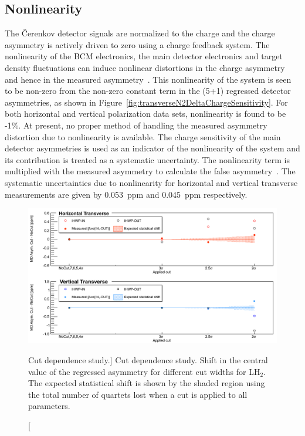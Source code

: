 \subsection{Nonlinearity}
\label{Nonlinearity}
The \v{C}erenkov detector signals are normalized to the charge and the charge asymmetry is actively driven to zero using a charge feedback system. The nonlinearity of the BCM electronics, the main detector electronics and target density fluctuations can induce nonlinear distortions in the charge asymmetry and hence in the measured asymmetry~\cite{mack_BCMLinearity}. This nonlinearity of the system is seen to be non-zero from the non-zero constant term in the (5+1) regressed detector asymmetries, as shown in Figure~\ref{fig:transverseN2DeltaChargeSensitivity}. For both horizontal and vertical polarization data sets, nonlinearity is found to be -1\%. At present, no proper method of handling the measured asymmetry distortion due to nonlinearity is available. The charge sensitivity of the main detector asymmetries is used as an indicator of the nonlinearity of the system and its contribution is treated as a systematic uncertainty. The nonlinearity term is multiplied with the measured asymmetry to calculate the false asymmetry~\cite{mack_nonlinearity}. The systematic uncertainties due to nonlinearity for horizontal and vertical transverse measurements are given by 0.053~ppm and 0.045~ppm respectively.


\begin{figure}[!h]
	\begin{center}
	\includegraphics[width=15.0cm]{figures/cutDependence_LH2}
	\end{center}
	\caption
	[Cut dependence study.]	
	{Cut dependence study. Shift in the central value of the regressed asymmetry for different cut widths for LH$_{2}$. The expected statistical shift is shown by the shaded region using the total number of quartets lost when a cut is applied to all parameters.}
	\label{fig:cutDependence_LH2}
\end{figure}

